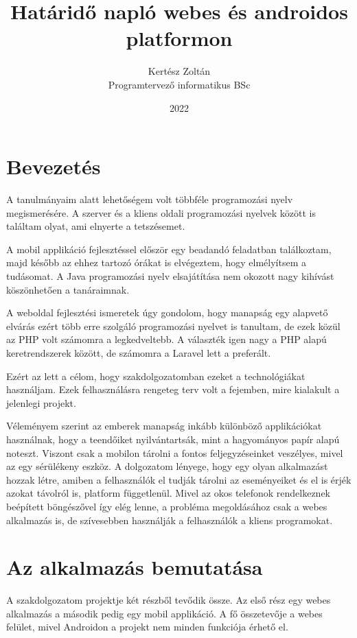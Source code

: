 \documentclass[
]{thesis-ekf}
\theoremstyle{definition}
\theoremstyle{remark}
\begin{document}
\title{Határidő napló webes és androidos platformon}
\author{Kertész Zoltán\\Programtervező informatikus BSc}
\date{2022}
\maketitle
\tableofcontents

\chapter*{Bevezetés}
A tanulmányaim alatt lehetőségem volt többféle programozási nyelv megismerésére. A szerver és a kliens oldali programozási nyelvek között is találtam olyat, ami elnyerte a tetszésemet. 

A mobil applikáció fejlesztéssel először egy beadandó feladatban találkoztam, majd később az ehhez tartozó órákat is elvégeztem, hogy elmélyítsem a tudásomat. A Java programozási nyelv elsajátítása nem okozott nagy kihívást köszönhetően a tanáraimnak. 

A weboldal fejlesztési ismeretek úgy gondolom, hogy manapság egy alapvető elvárás ezért több erre szolgáló programozási nyelvet is tanultam, de ezek közül az PHP volt számomra a legkedveltebb. A választék igen nagy a PHP alapú keretrendszerek között, de számomra a Laravel lett a preferált.

Ezért az lett a célom, hogy szakdolgozatomban ezeket a technológiákat használjam. Ezek felhasználásra rengeteg terv volt a fejemben, mire kialakult a jelenlegi projekt.

Véleményem szerint az emberek manapság inkább különböző applikációkat használnak, hogy a teendőiket nyilvántartsák, mint a hagyományos papír alapú noteszt. Viszont csak a mobilon tárolni a fontos feljegyzéseinket veszélyes, mivel az egy sérülékeny eszköz. A dolgozatom lényege, hogy egy olyan alkalmazást hozzak létre, amiben a felhasználók el tudják tárolni az eseményeiket és el is érjék azokat távolról is, platform függetlenül. Mivel az okos telefonok rendelkeznek beépített böngészővel így elég lenne, a probléma megoldásához csak a webes alkalmazás is, de szívesebben használják a felhasználók a kliens programokat. 

\chapter{Az alkalmazás bemutatása}
A szakdolgozatom projektje két részből tevődik össze. Az első rész egy webes alkalmazás a második pedig egy mobil applikáció. A fő összetevője a webes felület, mivel Androidon a projekt nem minden funkciója érhető el. 
\end{document}
